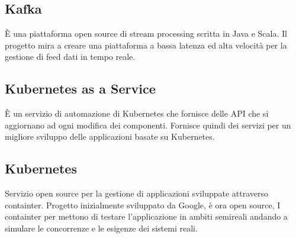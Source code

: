 \section{}
\subsection*{Kafka} È una piattaforma open source di stream processing scritta in Java e Scala. Il progetto mira a creare una piattaforma a bassa latenza ed alta velocità per la gestione di feed dati in tempo reale.

\subsection*{Kubernetes as a Service} È un servizio di automazione di Kubernetes che fornisce delle API che si aggiornano ad ogni modifica dei componenti. Fornisce quindi dei servizi per un migliore sviluppo delle applicazioni basate su Kubernetes.

\subsection*{Kubernetes} Servizio open source per la gestione di applicazioni sviluppate attraverso containter. Progetto inizialmente sviluppato da Google, è ora open source, I containter per mettono di testare l'applicazione in ambiti semireali andando a simulare le concorrenze e le esigenze dei sistemi reali.
